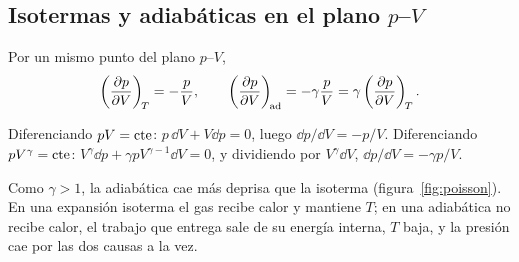 \subsection{Isotermas y adiabáticas en el plano \texorpdfstring{$p$--$V$}{p-V}}

\begin{proposicion}[Pendientes]
Por un mismo punto del plano $p$--$V$,
\begin{equation}\label{eq:pendientes}
  \left(\frac{\partial p}{\partial V}\right)_{\!T}=-\frac pV,\qquad \left(\frac{\partial p}{\partial V}\right)_{\!\mathrm{ad}}=-\gamma\frac pV=\gamma\left(\frac{\partial p}{\partial V}\right)_{\!T} .
\end{equation}
\end{proposicion}

\begin{demostracion}
Diferenciando $pV=\mathrm{cte}$: $p\,\dd V+V\dd p=0$, luego $\dd p/\dd V=-p/V$. Diferenciando $pV^\gamma=\mathrm{cte}$:
$V^\gamma\dd p+\gamma pV^{\gamma-1}\dd V=0$, y dividiendo por $V^\gamma\dd V$, $\dd p/\dd V=-\gamma p/V$.
\end{demostracion}

Como $\gamma>1$, la adiabática cae más deprisa que la isoterma (figura~\ref{fig:poisson}). En una expansión
isoterma el gas recibe calor y mantiene $T$; en una adiabática no recibe calor, el trabajo que entrega sale de
su energía interna, $T$ baja, y la presión cae por las dos causas a la vez.

